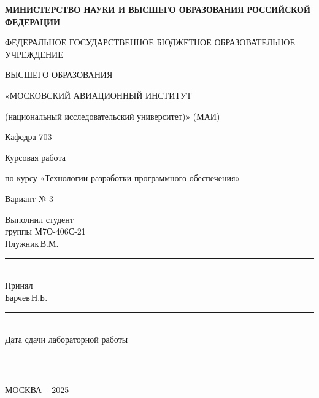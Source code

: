 \begin{titlepage}

\newpage
\fontsize{14pt}{16pt}\selectfont
\begin{center}
    \textbf{МИНИСТЕРСТВО НАУКИ И ВЫСШЕГО ОБРАЗОВАНИЯ РОССИЙСКОЙ ФЕДЕРАЦИИ}

    ФЕДЕРАЛЬНОЕ ГОСУДАРСТВЕННОЕ БЮДЖЕТНОЕ ОБРАЗОВАТЕЛЬНОЕ УЧРЕЖДЕНИЕ

    ВЫСШЕГО ОБРАЗОВАНИЯ

    «МОСКОВСКИЙ АВИАЦИОННЫЙ ИНСТИТУТ

    (национальный исследовательский университет)» (МАИ)

    \vspace{1cm}
    Кафедра 703

    \vspace{1cm}
    Курсовая работа

    по курсу «Технологии разработки программного обеспечения»

    Вариант № 3
\end{center}

\vspace{1cm}
\hfill
\begin{minipage}{0.4\textwidth}

    \raggedright

    Выполнил студент \\
    группы М7О-406С-21 \\
    Плужник\,В.М. \\
    \vspace{0.5cm}
    \rule{5cm}{0.4pt} \\

    Принял \\
    Барчев\,Н.Б. \\
    \vspace{0.5cm}
    \rule{5cm}{0.4pt} \\

    Дата сдачи лабораторной работы \\
    \vspace{0.5cm}
    \rule{5cm}{0.4pt} \\

\end{minipage}

\vfill
\begin{center}
    МОСКВА – 2025
\end{center}

\end{titlepage}